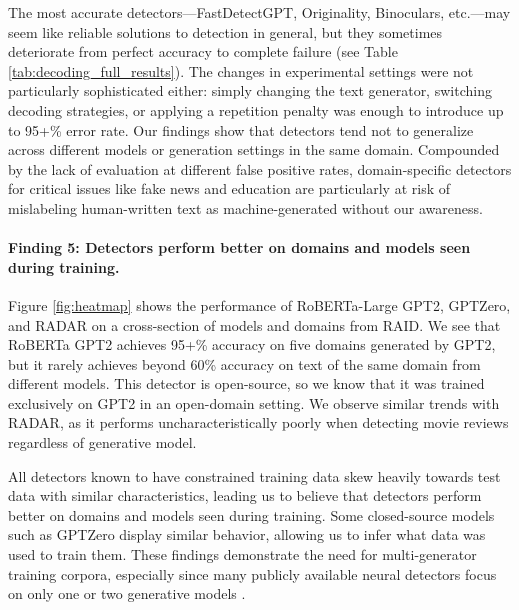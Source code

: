 \documentclass[11pt]{article}
\begin{document}
The most accurate detectors---FastDetectGPT, Originality, Binoculars, etc.---may seem like reliable solutions to detection in general, but they sometimes deteriorate from perfect accuracy to complete failure (see Table \ref{tab:decoding_full_results}). The changes in experimental settings were not particularly sophisticated either: simply changing the text generator, switching decoding strategies, or applying a repetition penalty was enough to introduce up to 95+\% error rate. Our findings show that detectors tend not to generalize across different models or generation settings in the same domain. Compounded by the lack of evaluation at different false positive rates, domain-specific detectors for critical issues like fake news and education are particularly at risk of mislabeling human-written text as machine-generated without our awareness.

\paragraph{Finding 5: Detectors perform better on domains and models seen during training.}

Figure \ref{fig:heatmap} shows the performance of RoBERTa-Large GPT2, GPTZero, and RADAR on a cross-section of models and domains from RAID. We see that RoBERTa GPT2 achieves 95+\% accuracy on five domains generated by GPT2, but it rarely achieves beyond 60\% accuracy on text of the same domain from different models. This detector is open-source, so we know that it was trained exclusively on GPT2 in an open-domain setting. We observe similar trends with RADAR, as it performs uncharacteristically poorly when detecting movie reviews regardless of generative model.

All detectors known to have constrained training data skew heavily towards test data with similar characteristics, leading us to believe that detectors perform better on domains and models seen during training. Some closed-source models such as GPTZero display similar behavior, allowing us to infer what data was used to train them. These findings demonstrate the need for multi-generator training corpora, especially since many publicly available neural detectors focus on only one or two generative models \cite{guo2023close}.
\end{document}
